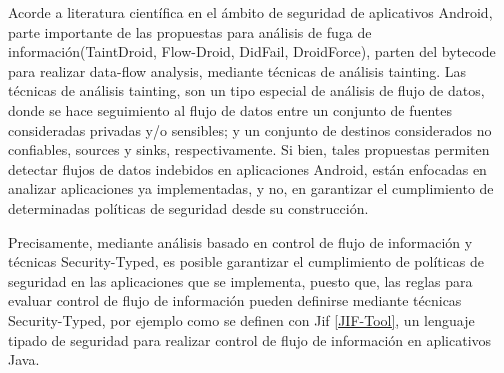 Acorde a literatura científica en el ámbito de seguridad de aplicativos
Android, parte importante de las propuestas para análisis de fuga de
información(TaintDroid\cite{TaintDroid}, Flow-Droid\cite{FlowDroid-Thesis},
DidFail\cite{DidFail}, DroidForce\cite{DroidForce}), parten del bytecode para
realizar data-flow analysis, mediante técnicas de análisis tainting. Las
técnicas de análisis tainting, son un tipo especial de análisis de flujo de
datos, donde se hace seguimiento al flujo de datos entre un conjunto de fuentes
consideradas privadas y/o sensibles; y un conjunto de destinos considerados no
confiables, sources y sinks, respectivamente.\newline 
Si bien, tales propuestas permiten detectar flujos de datos indebidos en
aplicaciones Android, están enfocadas en analizar aplicaciones ya implementadas,
y no, en garantizar el cumplimiento de determinadas políticas de seguridad desde
su construcción.
% 

Precisamente, mediante análisis basado en control de flujo de información y
técnicas Security-Typed, es posible garantizar el cumplimiento de políticas de
seguridad en las aplicaciones que se implementa, puesto que,
las reglas para evaluar control de flujo de
información pueden definirse mediante técnicas Security-Typed, por ejemplo como
se definen con Jif \ref{JIF-Tool}, un lenguaje tipado de seguridad para realizar
control de flujo de información en aplicativos Java.
% 
